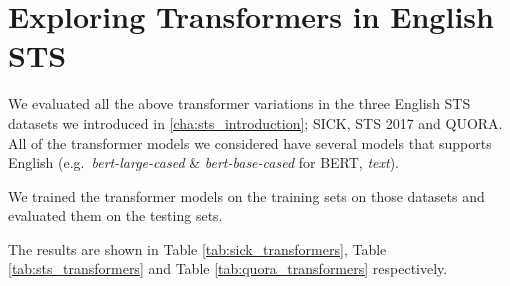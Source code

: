 \section{Exploring Transformers in English STS}
We evaluated all the above transformer variations in the three English STS datasets we introduced in \ref{cha:sts_introduction}; SICK, STS 2017 and QUORA. All of the transformer models we considered have several models that supports English (e.g.\ \textit{bert-large-cased} \& \textit{bert-base-cased} for BERT, \textit{text}).

 We trained the transformer models on the training sets on those datasets and evaluated them on the testing sets. 

The results are shown in Table \ref{tab:sick_transformers}, Table \ref{tab:sts_transformers} and Table \ref{tab:quora_transformers} respectively. 

\begin{table}[htb]
	\centering
	\caption[Results for SICK with Transformer Models]{Results for SICK dataset with different variants of transformer models. For each variant, Pearson Correlation ($\bm{\rho}$) and Spearman Correlation ($\bm{\tau}$) are reported between the predicted values and the gold labels of the test set. Best result from all the variations is marked with ${\dagger}$.}  
	\label{tab:sick_transformers}
\end{table}


